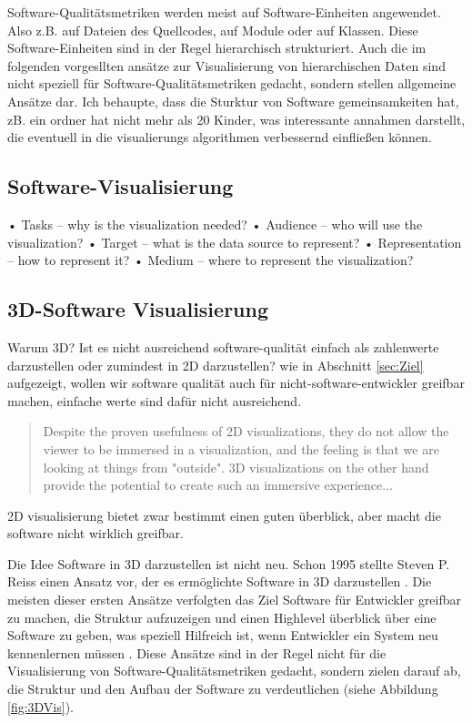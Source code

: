 Software-Qualitätsmetriken werden meist auf Software-Einheiten angewendet. Also z.B. auf Dateien des Quellcodes, auf Module oder auf Klassen. Diese Software-Einheiten sind in der Regel hierarchisch strukturiert. Auch die im folgenden vorgesllten ansätze zur Visualisierung von hierarchischen Daten sind nicht speziell für Software-Qualitätsmetriken gedacht, sondern stellen allgemeine Ansätze dar. Ich behaupte, dass die Sturktur von Software gemeinsamkeiten hat, zB. ein ordner hat nicht mehr als 20 Kinder, was interessante annahmen darstellt, die eventuell in die visualierungs algorithmen verbessernd einfließen können.  

\subsection{Software-Visualisierung} \label{sec:SoftwareVisualisierung} 

• Tasks – why is the visualization needed?
• Audience – who will use the visualization?
• Target – what is the data source to represent?
• Representation – how to represent it?
• Medium – where to represent the visualization?
\cite[2]{3dsoftwareMarcus}

\subsection{3D-Software Visualisierung} \label{sec:3DSoftwareVisualisierung}   
Warum 3D? Ist es nicht ausreichend software-qualität einfach als zahlenwerte darzustellen oder zumindest in 2D darzustellen?
wie in Abschnitt \ref{sec:Ziel} aufgezeigt, wollen wir software qualität auch für nicht-software-entwickler greifbar machen, einfache werte sind dafür nicht ausreichend.
\begin{quote}
Despite the proven usefulness of 2D visualizations, they do not allow the viewer to be immersed in a visualization, and the feeling is that we are looking at things from "outside". 3D visualizations on the other hand provide the potential to create such an immersive experience... \cite[1]{codeCity1}
\end{quote}
2D visualisierung bietet zwar bestimmt einen guten überblick, aber macht die software nicht wirklich greifbar. 

Die Idee Software in 3D darzustellen ist nicht neu. Schon 1995 stellte Steven P. Reiss einen Ansatz vor, der es ermöglichte Software in 3D darzustellen \cite{first_3D_vis}. Die meisten dieser ersten Ansätze verfolgten das Ziel Software für Entwickler greifbar zu machen, die Struktur aufzuzeigen und einen Highlevel überblick über eine Software zu geben, was speziell Hilfreich ist, wenn Entwickler ein System neu kennenlernen müssen \cite{visSoftwareVR}.  Diese Ansätze sind in der Regel nicht für die Visualisierung von Software-Qualitätsmetriken gedacht, sondern zielen darauf ab, die Struktur und den Aufbau der Software zu verdeutlichen (siehe Abbildung \ref{fig:3DVis}).  

